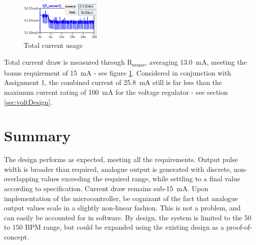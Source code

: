 \begin{figure}
\centering
\vspace{-0.5cm}
\includegraphics[width=0.35\textwidth]{./Figures/current2}
\caption{Total current usage}
\label{fig:current2}
\end{figure}
Total current draw is measured through R\textsubscript{sense}, averaging \SI{13.0}{mA}, meeting the bonus requirement of \SI{15}{mA} - see figure \ref{fig:current2}. Considered in conjunction with Assignment 1, the combined current of \SI{25.8}{mA} still is far less than the maximum current rating of \SI{100}{mA} for the voltage regulator - see section \ref{sec:voltDesign}. 

\section{Summary}\label{sec:temp_summary}
The design performs as expected, meeting all the requirements. Output pulse width is broader than required, analogue output is generated with discrete, non-overlapping values exceeding the required range, while settling to a final value according to specification.  Current draw remains sub-\SI{15}{mA}. Upon implementation of the microcontroller, be cognizant of the fact that analogue output values scale in a slightly non-linear fashion. This is not a problem, and can easily be accounted for in software. By design, the system is limited to the 50 to 150 BPM range, but could be expanded using the existing design as a proof-of-concept. 